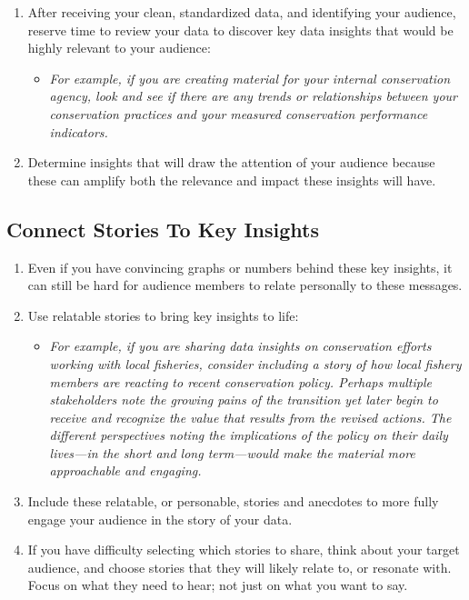 \documentclass[
]{book}
\providecommand{\tightlist}{%
  \setlength{\itemsep}{0pt}\setlength{\parskip}{0pt}}
\begin{document}
\begin{enumerate}
\def\labelenumi{\arabic{enumi}.}
\tightlist
\item
  After receiving your clean, standardized data, and identifying your audience, reserve time to review your data to discover key data insights that would be highly relevant to your audience:

  \begin{itemize}
  \tightlist
  \item
    \emph{For example, if you are creating material for your internal conservation agency, look and see if there are any trends or relationships between your conservation practices and your measured conservation performance indicators.}
  \end{itemize}
\item
  Determine insights that will draw the attention of your audience because these can amplify both the relevance and impact these insights will have.
\end{enumerate}

\hypertarget{connect-stories-to-key-insights}{%
\subsection{Connect Stories To Key Insights}\label{connect-stories-to-key-insights}}

\begin{enumerate}
\def\labelenumi{\arabic{enumi}.}
\tightlist
\item
  Even if you have convincing graphs or numbers behind these key insights, it can still be hard for audience members to relate personally to these messages.
\item
  Use relatable stories to bring key insights to life:

  \begin{itemize}
  \tightlist
  \item
    \emph{For example, if you are sharing data insights on conservation efforts working with local fisheries, consider including a story of how local fishery members are reacting to recent conservation policy. Perhaps multiple stakeholders note the growing pains of the transition yet later begin to receive and recognize the value that results from the revised actions. The different perspectives noting the implications of the policy on their daily lives---in the short and long term---would make the material more approachable and engaging.}
  \end{itemize}
\item
  Include these relatable, or personable, stories and anecdotes to more fully engage your audience in the story of your data.
\item
  If you have difficulty selecting which stories to share, think about your target audience, and choose stories that they will likely relate to, or resonate with. Focus on what they need to hear; not just on what you want to say.
\end{enumerate}
\end{document}
